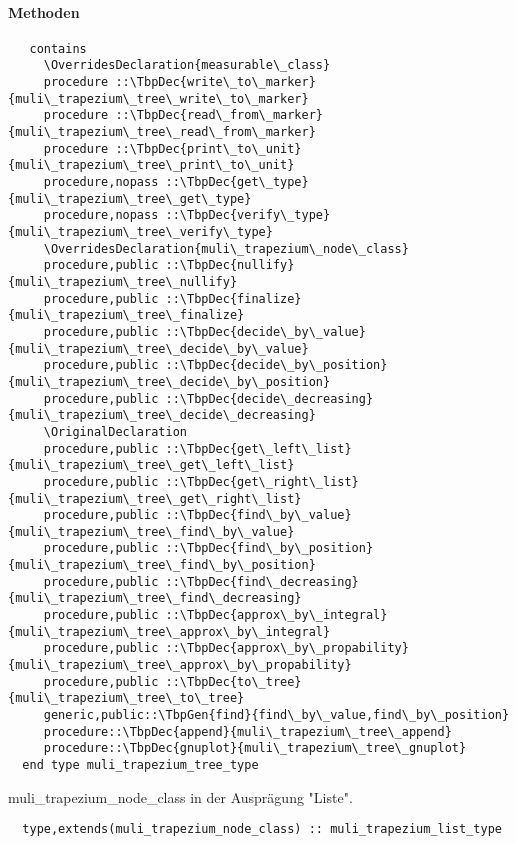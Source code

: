 \paragraph{Methoden}
\begin{Verbatim}
   contains
     \OverridesDeclaration{measurable\_class}
     procedure ::\TbpDec{write\_to\_marker}{muli\_trapezium\_tree\_write\_to\_marker}
     procedure ::\TbpDec{read\_from\_marker}{muli\_trapezium\_tree\_read\_from\_marker}
     procedure ::\TbpDec{print\_to\_unit}{muli\_trapezium\_tree\_print\_to\_unit}
     procedure,nopass ::\TbpDec{get\_type}{muli\_trapezium\_tree\_get\_type}
     procedure,nopass ::\TbpDec{verify\_type}{muli\_trapezium\_tree\_verify\_type}
     \OverridesDeclaration{muli\_trapezium\_node\_class}
     procedure,public ::\TbpDec{nullify}{muli\_trapezium\_tree\_nullify}
     procedure,public ::\TbpDec{finalize}{muli\_trapezium\_tree\_finalize}
     procedure,public ::\TbpDec{decide\_by\_value}{muli\_trapezium\_tree\_decide\_by\_value}
     procedure,public ::\TbpDec{decide\_by\_position}{muli\_trapezium\_tree\_decide\_by\_position}
     procedure,public ::\TbpDec{decide\_decreasing}{muli\_trapezium\_tree\_decide\_decreasing}
     \OriginalDeclaration
     procedure,public ::\TbpDec{get\_left\_list}{muli\_trapezium\_tree\_get\_left\_list}
     procedure,public ::\TbpDec{get\_right\_list}{muli\_trapezium\_tree\_get\_right\_list}
     procedure,public ::\TbpDec{find\_by\_value}{muli\_trapezium\_tree\_find\_by\_value}
     procedure,public ::\TbpDec{find\_by\_position}{muli\_trapezium\_tree\_find\_by\_position}
     procedure,public ::\TbpDec{find\_decreasing}{muli\_trapezium\_tree\_find\_decreasing}
     procedure,public ::\TbpDec{approx\_by\_integral}{muli\_trapezium\_tree\_approx\_by\_integral}
     procedure,public ::\TbpDec{approx\_by\_propability}{muli\_trapezium\_tree\_approx\_by\_propability}
     procedure,public ::\TbpDec{to\_tree}{muli\_trapezium\_tree\_to\_tree}
     generic,public::\TbpGen{find}{find\_by\_value,find\_by\_position}
     procedure::\TbpDec{append}{muli\_trapezium\_tree\_append}
     procedure::\TbpDec{gnuplot}{muli\_trapezium\_tree\_gnuplot}
  end type muli_trapezium_tree_type
\end{Verbatim}
muli\_trapezium\_node\_class in der Ausprägung "Liste".
\begin{Verbatim}
  type,extends(muli_trapezium_node_class) :: muli_trapezium_list_type
\end{Verbatim}
